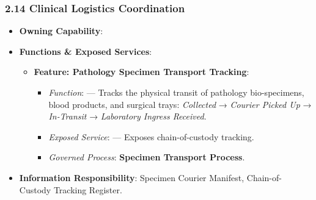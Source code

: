 \par\smallskip
{}\label{rad:hso:261}



\label{rad:hso:263}
\subsubsection*{2.14 Clinical Logistics Coordination}
\label{rad:hso:264}

\begin{itemize}

\item
\textbf{Owning Capability}: \texttt{}



\item
\textbf{Functions \& Exposed Services}:


\begin{itemize}

\item
\textbf{Feature: Pathology Specimen Transport Tracking}:


\begin{itemize}

\item
\emph{Function}: \texttt{} — Tracks the physical transit of pathology bio-specimens, blood products, and surgical trays: \emph{Collected} → \emph{Courier Picked Up} → \emph{In-Transit} → \emph{Laboratory Ingress Received}.



\item
\emph{Exposed Service}: \texttt{} — Exposes chain-of-custody tracking.



\item
\emph{Governed Process}: \textbf{Specimen Transport Process}.



\end{itemize}


\end{itemize}


\item
\textbf{Information Responsibility}: Specimen Courier Manifest, Chain-of-Custody Tracking Register.



\end{itemize}
\label{rad:hso:272}

